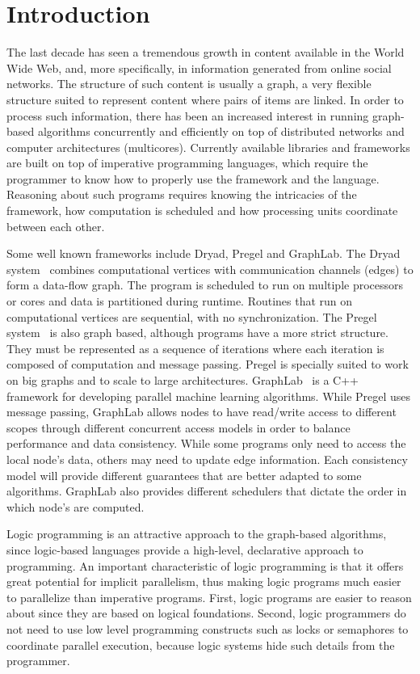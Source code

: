 \section{Introduction}

The last decade has seen a tremendous growth in content available in the World Wide Web, and, more specifically,
in information generated from online social networks. The structure of such content is usually a graph, a very
flexible structure suited to represent content where pairs of items are linked.
In order to process such information, there has been an increased interest in running graph-based
algorithms concurrently and efficiently on top of distributed networks and computer architectures (multicores).
Currently available libraries and frameworks are built on top of imperative programming languages, which
require the programmer to know how to properly use the framework and the language. Reasoning about such
programs requires knowing the intricacies of the framework, how computation is scheduled and how processing
units coordinate between each other.

Some well known frameworks include Dryad, Pregel and GraphLab.
The Dryad system~\cite{Isard:2007:DDD:1272996.1273005} combines computational vertices
with communication channels (edges) to form a data-flow graph. The program is scheduled to
run on multiple processors or cores and data is partitioned during runtime. Routines that run on computational vertices
are sequential, with no synchronization.
The Pregel system~\cite{Malewicz:2010:PSL:1807167.1807184} is also graph based, although programs have a more strict
structure. They must be represented as a sequence of iterations where each iteration is composed of computation and message passing.
Pregel is specially suited to work on big graphs and to scale to large architectures.
GraphLab~\cite{GraphLab2010} is a C++ framework for developing parallel machine learning
algorithms. While Pregel uses message passing, GraphLab allows nodes to have read/write
access to different scopes through different concurrent access models in order to balance
performance and data consistency. While some programs only need to access the local node's
data, others may need to update edge information. Each consistency model will provide different
guarantees that are better adapted to some algorithms. GraphLab also provides different
schedulers that dictate the order in which node's are computed.

Logic programming is an attractive approach to the graph-based algorithms,
since logic-based languages provide a high-level, declarative approach
to programming. An important characteristic of logic programming is
that it offers great potential for implicit parallelism, thus making
logic programs much easier to parallelize than imperative
programs. First, logic programs are easier to reason about since they
are based on logical foundations. Second, logic programmers do not
need to use low level programming constructs such as locks or
semaphores to coordinate parallel execution, because logic systems
hide such details from the programmer.

